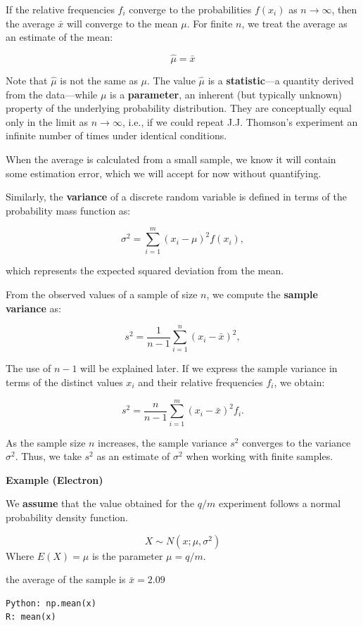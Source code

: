 \documentclass[
]{book}
\begin{document}
If the relative frequencies \(f_i\) converge to the probabilities \(f(x_i)\) as \(n \to \infty\), then the average \(\bar{x}\) will converge to the mean \(\mu\). For finite \(n\), we treat the average as an estimate of the mean:

\[
\hat{\mu} = \bar{x}
\]

Note that \(\hat{\mu}\) is not the same as \(\mu\). The value \(\hat{\mu}\) is a \textbf{statistic}---a quantity derived from the data---while \(\mu\) is a \textbf{parameter}, an inherent (but typically unknown) property of the underlying probability distribution. They are conceptually equal only in the limit as \(n \to \infty\), i.e., if we could repeat J.J. Thomson's experiment an infinite number of times under identical conditions.

When the average is calculated from a small sample, we know it will contain some estimation error, which we will accept for now without quantifying.

Similarly, the \textbf{variance} of a discrete random variable is defined in terms of the probability mass function as:

\[
\sigma^2 = \sum_{i=1}^m (x_i - \mu)^2 f(x_i),
\]

which represents the expected squared deviation from the mean.

From the observed values of a sample of size \(n\), we compute the \textbf{sample variance} as:

\[
s^2 = \frac{1}{n - 1} \sum_{i=1}^n (x_i - \bar{x})^2,
\]

The use of \(n - 1\) will be explained later. If we express the sample variance in terms of the distinct values \(x_i\) and their relative frequencies \(f_i\), we obtain:

\[
s^2 = \frac{n}{n - 1} \sum_{i=1}^m (x_i - \bar{x})^2 f_i.
\]

As the sample size \(n\) increases, the sample variance \(s^2\) converges to the variance \(\sigma^2\). Thus, we take \(s^2\) as an estimate of \(\sigma^2\) when working with finite samples.

\textbf{Example (Electron)}

We \textbf{assume} that the value obtained for the \(q/m\) experiment follows a normal probability density function.

\[X \sim N(x; \mu, \sigma^2)\]
Where \(E(X)=\mu\) is the parameter \(\mu=q/m\).

the average of the sample is \(\bar{x}=2.09\)

\begin{verbatim}
Python: np.mean(x)
R: mean(x)
\end{verbatim}
\end{document}
